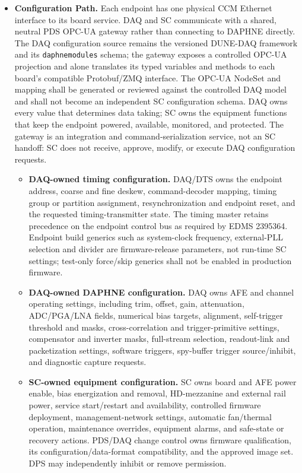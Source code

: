 \begin{itemize}
  \item\textbf{Configuration Path.} Each endpoint has one physical CCM Ethernet interface to its board service. DAQ and SC communicate with a shared, neutral PDS OPC-UA gateway rather than connecting to DAPHNE directly. The DAQ configuration source remains the versioned DUNE-DAQ framework and its \texttt{daphnemodules} schema; the gateway exposes a controlled OPC-UA projection and alone translates its typed variables and methods to each board's compatible Protobuf/ZMQ interface. The OPC-UA NodeSet and mapping shall be generated or reviewed against the controlled DAQ model and shall not become an independent SC configuration schema. DAQ owns every value that determines data taking; SC owns the equipment functions that keep the endpoint powered, available, monitored, and protected. The gateway is an integration and command-serialization service, not an SC handoff: SC does not receive, approve, modify, or execute DAQ configuration requests.
  \begin{itemize}[nosep]
    \item \textbf{DAQ-owned timing configuration.} DAQ/DTS owns the endpoint address, coarse and fine deskew, command-decoder mapping, timing group or partition assignment, resynchronization and endpoint reset, and the requested timing-transmitter state. The timing master retains precedence on the endpoint control bus as required by EDMS 2395364. Endpoint build generics such as system-clock frequency, external-PLL selection and divider are firmware-release parameters, not run-time SC settings; test-only force/skip generics shall not be enabled in production firmware.
    \item \textbf{DAQ-owned DAPHNE configuration.} DAQ owns AFE and channel operating settings, including trim, offset, gain, attenuation, ADC/PGA/LNA fields, numerical bias targets, alignment, self-trigger threshold and masks, cross-correlation and trigger-primitive settings, compensator and inverter masks, full-stream selection, readout-link and packetization settings, software triggers, spy-buffer trigger source/inhibit, and diagnostic capture requests.
    \item \textbf{SC-owned equipment configuration.} SC owns board and AFE power enable, bias energization and removal, HD-mezzanine and external rail power, service start/restart and availability, controlled firmware deployment, management-network settings, automatic fan/thermal operation, maintenance overrides, equipment alarms, and safe-state or recovery actions. PDS/DAQ change control owns firmware qualification, its configuration/data-format compatibility, and the approved image set. DPS may independently inhibit or remove permission.

\end{itemize}
\end{itemize}
